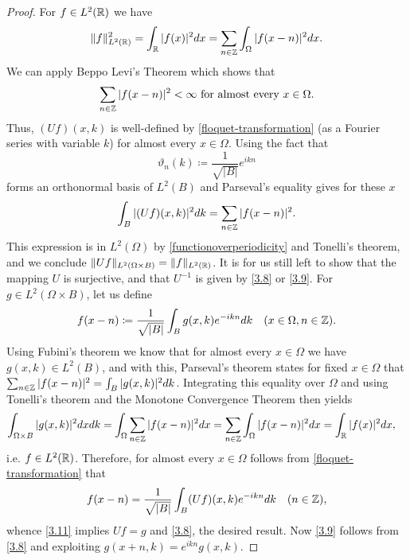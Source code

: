 \begin{theorem}
	\begin{proof}
		For $f \in L^{2}(\mathbb{R})$ we have
		\begin{equation}
			\| f \|_{L^{2}(\mathbb{R})}^{2} = \int_{\mathbb{R}} |f(x)|^{2} dx = \sum_{n \in \mathbb{Z}} \int_{\Omega} |f(x - n)|^{2} dx.\label{functionoverperiodicity}
		\end{equation} 
		We can apply Beppo Levi's Theorem which shows that
		\[ \sum_{n \in \mathbb{Z}} |f(x - n)|^{2} < \infty \text{ for almost every } x \in \Omega.\]
		Thus, $(Uf)(x, k)$ is well-defined by \eqref{floquet-transformation} (as a Fourier series with variable $k$) for almost every $x \in \Omega$. Using the fact that 
		\[ \vartheta_{n}(k) \coloneqq \frac{1}{\sqrt{|B|}} e^{ikn} \]
		forms an orthonormal basis of $L^{2}(B)$ and Parseval's equality gives for these $x$
		\[ \int_{B}|(Uf)(x,k)|^{2} dk = \sum_{n \in \mathbb{Z}} |f(x - n)|^{2}. \]
	 	This expression is in $L^{2}(\Omega)$ by \eqref{functionoverperiodicity} and Tonelli's theorem, and we conclude $\| Uf \|_{L^{2}(\Omega \times B)} = \|f\|_{L^{2}(\mathbb{R})}$. It is for us still left to show that the mapping $U$ is surjective, and that $U^{-1}$ is given by \eqref{3.8} or \eqref{3.9}. For $g \in L^{2}(\Omega \times B)$, let us define
		\begin{equation}
			f(x - n) \coloneqq \frac{1}{\sqrt{|B|}} \int_{B} g(x, k) e^{-ikn} dk \quad (x \in \Omega, n \in\mathbb{Z}).\label{3.11}
		\end{equation}
		Using Fubini's theorem we know that for almost every $x \in \Omega$ we have $g(x, k) \in L^{2}(B)$, and with this, Parseval's theorem states for fixed $x \in \Omega$ that $\sum_{n \in \mathbb{Z}} |f(x - n)|^{2} = \int_{B} |g(x, k)|^{2} dk$. Integrating this equality over $\Omega$ and using Tonelli's theorem and the Monotone Convergence Theorem then yields
		\begin{align*}
			\int_{\Omega \times B} |g(x, k)|^{2} dx dk & = \int_{\Omega} \sum_{n \in \mathbb{Z}} |f(x - n)|^{2} dx  = \sum_{n \in\mathbb{Z}} \int_{\Omega} |f(x-n)|^{2} dx = \int_{\mathbb{R}} |f(x)|^{2} dx,	
		\end{align*}
		i.e. $f \in L^{2}(\mathbb{R})$. Therefore, for almost every $x \in \Omega$ follows from \eqref{floquet-transformation} that
		\[ f(x - n) = \frac{1}{\sqrt{|B|}} \int_{B} (Uf)(x,k) e^{-ikn} dk \quad (n \in \mathbb{Z}), \]
		whence \eqref{3.11} implies $U f = g$ and \eqref{3.8}, the desired result. Now \eqref{3.9} follows from \eqref{3.8} and exploiting $g(x + n, k) = e^{ikn} g(x, k)$.
	\end{proof}				
\end{theorem}

